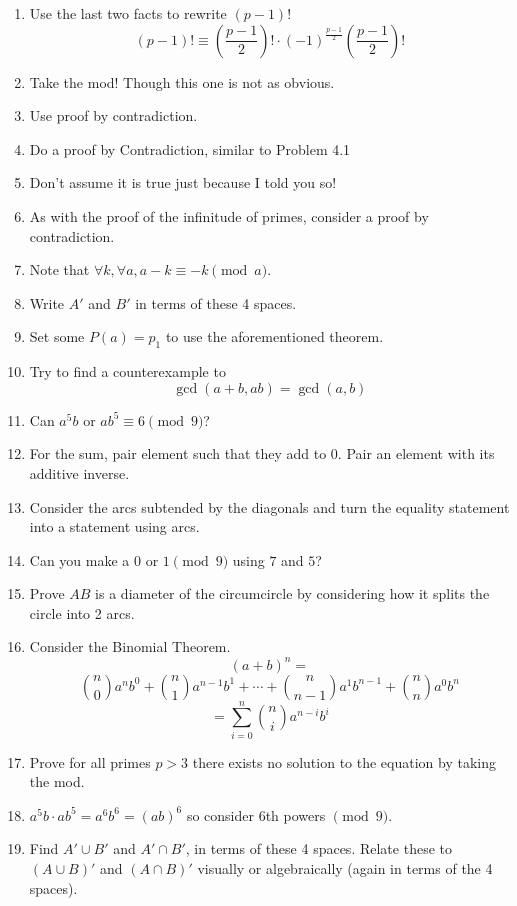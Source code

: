 \begin{enumerate}[label=\textbf{H\arabic*.}]
    \noindent $\{p_1, p_2, \ldots, p_k\}$. Consider the integer
    \[
    N = 4p_1p_2\cdots p_k -1
    \]
    and analyze $\pmod{4}$.
    \item Use the last two facts to rewrite $(p-1)!$
    \[
    (p-1)! \equiv  \left( \frac{p-1}{2} \right)! \cdot  (-1)^{\frac{p-1}{2}}\left( \frac{p-1}{2} \right)! 
    \]
    \item Take the mod! Though this one is not as obvious.
    \item Use proof by contradiction.
    \item Do a proof by Contradiction, similar to Problem 4.1
    \item Don't assume it is true just because I told you so!
    \item As with the proof of the infinitude of primes, consider a proof by contradiction.
    \item Note that $\forall k, \forall a, a-k \equiv -k \pmod{a}$.
    \item Write $A'$ and $B'$ in terms of these 4 spaces. 
    \item Set some $P(a) = p_1$ to use the aforementioned theorem.
    \item Try to find a counterexample to 
    \[
    \gcd(a+b, ab) = \gcd(a, b)
    \]
    \item Can $a^5b$ or $ab^5 \equiv 6 \pmod{9}$?
    \item For the sum, pair element such that they add to $0$. Pair an element with its additive inverse.
    \item Consider the arcs subtended by the diagonals and turn the equality statement into a statement using arcs.
    \item Can you make a $0$ or $1 \pmod{9}$ using $7$ and $5$?
    \item Prove $AB$ is a diameter of the circumcircle by considering how it splits the circle into 2 arcs.
    \item  Consider the Binomial Theorem. 
    \[
    (a+b)^n = 
    \]
    \[
    \binom{n}{0}a^nb^0 + \binom{n}{1}a^{n-1}b^1 + \cdots + \binom{n}{n-1}a^1b^{n-1} + \binom{n}{n}a^0b^n
    \]
    \[
    = \sum_{i=0}^{n}\binom{n}{i}a^{n-i}b^i
    \]
    \item Prove for all primes $p > 3$ there exists no solution to the equation by taking the mod.
    \item $a^5b \cdot ab^5 = a^6b^6 = (ab)^6$ so consider 6th powers $\pmod{9}$.
    \item Find $A' \cup B'$ and $A' \cap B'$, in terms of these 4 spaces. Relate these to $(A \cup B)'$ and $(A \cap B)'$ visually or algebraically (again in terms of the 4 spaces). 

\end{enumerate}
